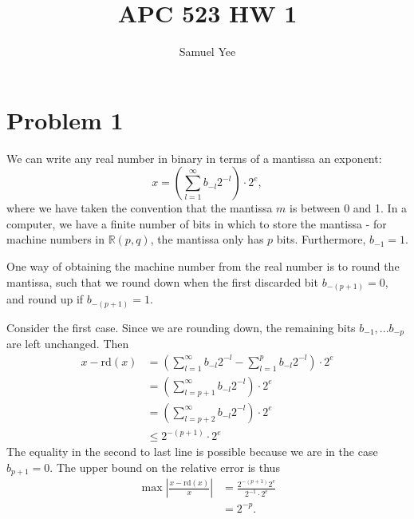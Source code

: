 \documentclass[12pt]{article}
\title{APC 523 HW 1}
\author{Samuel Yee}
\begin{document}
\maketitle

\section*{Problem 1}

We can write any real number in binary in terms of a mantissa an exponent:
\begin{equation*}
x = \left(\sum_{l=1}^\infty b_{-l} 2^{-l} \right)\cdot 2^e,
\end{equation*}
where we have taken the convention that the mantissa $m$ is between 0 and 1. In a computer, we have a finite number of bits in which to store the mantissa - for machine numbers in $\mathbb{R}(p, q)$, the mantissa only has $p$ bits. Furthermore, $b_{-1} = 1$. 

One way of obtaining the machine number from the real number is to round the mantissa, such that we round down when the first discarded bit $b_{-(p+1)}=0$, and round up if $b_{-(p+1)} = 1$. 

Consider the first case. Since we are rounding down, the remaining bits $b_{-1}, ... b_{-p}$ are left unchanged. Then
\begin{equation*}
\begin{aligned}
x - \mathrm{rd}(x) &= \left(\sum_{l=1}^\infty b_{-l} 2^{-l} - \sum_{l=1}^p b_{-l} 2^{-l} \right)\cdot 2^e \\
&= \left(\sum_{l=p+1}^\infty b_{-l} 2^{-l} \right)\cdot 2^e \\
&= \left(\sum_{l=p+2}^\infty b_{-l} 2^{-l} \right)\cdot 2^e \\
&\leq 2^{-(p+1)}\cdot 2^e
\end{aligned}
\end{equation*}
The equality in the second to last line is possible because we are in the case $b_{p+1} = 0$. The upper bound on the relative error is thus
\begin{equation*}
\begin{aligned}
\max \left|\frac{x - \mathrm{rd}(x)}{x}\right| &= \frac{2^{-(p+1)}2^e}{2^{-1}\cdot2^e} \\
&= 2^{-p}.
\end{aligned}
\end{equation*}
\end{document}
